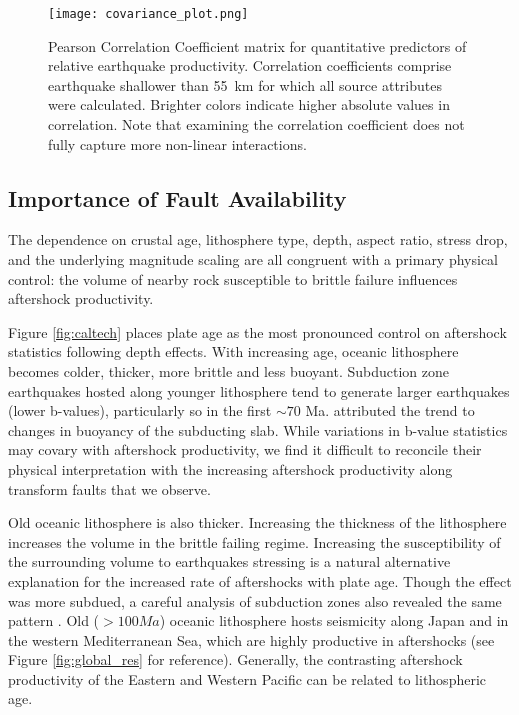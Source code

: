 \documentclass[draft, jgrga]{agujournal2018}
\begin{document}
 \begin{figure}
    \centering
    \texttt{[image: covariance\_plot.png]}
    \caption{Pearson Correlation Coefficient matrix for quantitative predictors of relative earthquake productivity. Correlation coefficients comprise earthquake shallower than 55~km for which all source attributes were calculated. Brighter colors indicate higher absolute values in correlation. Note that examining the correlation coefficient does not fully capture more non-linear interactions.}
    \label{fig:covariance}
\end{figure}

\subsection{Importance of Fault Availability}

The dependence on crustal age, lithosphere type, depth, aspect ratio, stress drop, and the underlying magnitude scaling are all congruent with a primary physical control: the volume of nearby rock susceptible to brittle failure influences aftershock productivity.

 Figure \ref{fig:caltech} places plate age as the most pronounced control on aftershock statistics following depth effects. With increasing age, oceanic lithosphere becomes colder, thicker, more brittle and less buoyant. Subduction zone earthquakes hosted along younger lithosphere tend to generate larger earthquakes (lower b-values), particularly so in the first $\sim70$ Ma. \citet{Nishikawa2014EarthquakeBuoyancy} attributed the trend to changes in buoyancy of the subducting slab. While variations in b-value statistics may covary with aftershock productivity, we find it difficult to reconcile their physical interpretation with the increasing aftershock productivity along transform faults that we observe.

Old oceanic lithosphere is also thicker. Increasing the thickness of the lithosphere increases the volume in the brittle failing regime. Increasing the susceptibility of the surrounding volume to earthquakes stressing is a natural alternative explanation for the increased rate of aftershocks with plate age. Though the effect was more subdued, a careful analysis of subduction zones also revealed the same pattern \citep[Appendix of][]{Wetzler2016}. Old ($>100Ma$) oceanic lithosphere hosts seismicity along Japan and in the western Mediterranean Sea, which are highly productive in aftershocks (see Figure \ref{fig:global_res} for reference). Generally, the contrasting aftershock productivity of the Eastern and Western Pacific can be related to lithospheric age.
\end{document}
